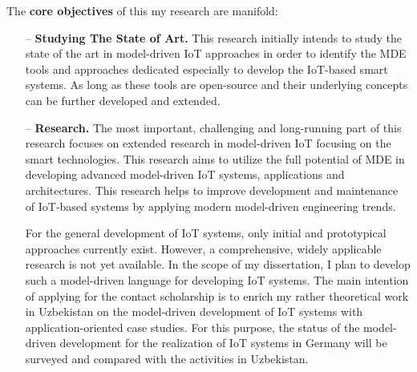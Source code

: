 \documentclass[10pt, oneside]{article}
\begin{document}
The \textbf{core objectives} of this my research are manifold:
\begin{itemize}
\item[--] \textbf{Studying The State of Art.} This research initially intends to study the state of the art in model-driven IoT approaches in order to identify the MDE tools and approaches dedicated especially to develop the IoT-based smart systems. As long as these tools are open-source and their underlying concepts can be further developed and extended. 
\item[--] \textbf{Research.} The most important, challenging and long-running part of this research focuses on extended research in model-driven IoT focusing on the smart technologies. This research aims to utilize the full potential of MDE in developing advanced model-driven IoT systems, applications and architectures. This research helps to improve development and maintenance of IoT-based systems by applying modern model-driven engineering trends. 

For the general development of IoT systems, only initial and prototypical approaches currently exist. However, a comprehensive, widely applicable research is not yet available. In the scope of my dissertation, I plan to develop such a model-driven language for developing IoT systems. The main intention of applying for the contact scholarship is to enrich my rather theoretical work in Uzbekistan on the model-driven development of IoT systems with application-oriented case studies. For this purpose, the status of the model-driven development for the realization of IoT systems in Germany will be surveyed and compared with the activities in Uzbekistan.


\end{itemize}
\end{document}
